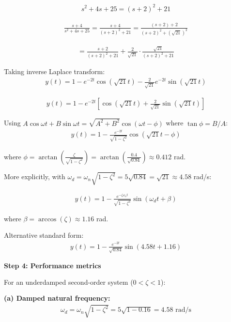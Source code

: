 \documentclass[11pt,a4paper]{article}
\begin{document}
\begin{align}
s^2 + 4s + 25 = (s+2)^2 + 21
\end{align}

\begin{align}
\frac{s + 4}{s^2 + 4s + 25} = \frac{s + 4}{(s+2)^2 + 21} = \frac{(s+2) + 2}{(s+2)^2 + (\sqrt{21})^2}
\end{align}

\begin{align}
= \frac{s+2}{(s+2)^2 + 21} + \frac{2}{\sqrt{21}} \cdot \frac{\sqrt{21}}{(s+2)^2 + 21}
\end{align}

Taking inverse Laplace transform:
\begin{align}
y(t) = 1 - e^{-2t}\cos(\sqrt{21}t) - \frac{2}{\sqrt{21}}e^{-2t}\sin(\sqrt{21}t)
\end{align}

\begin{align}
y(t) = 1 - e^{-2t}\left[\cos(\sqrt{21}t) + \frac{2}{\sqrt{21}}\sin(\sqrt{21}t)\right]
\end{align}

Using $A\cos\omega t + B\sin\omega t = \sqrt{A^2+B^2}\cos(\omega t - \phi)$ where $\tan\phi = B/A$:
\begin{align}
y(t) = 1 - \frac{e^{-2t}}{\sqrt{1 - \zeta^2}}\cos(\sqrt{21}t - \phi)
\end{align}

where $\phi = \arctan\left(\frac{\zeta}{\sqrt{1-\zeta^2}}\right) = \arctan\left(\frac{0.4}{\sqrt{0.84}}\right) \approx 0.412$ rad.

More explicitly, with $\omega_d = \omega_n\sqrt{1-\zeta^2} = 5\sqrt{0.84} = \sqrt{21} \approx 4.58$ rad/s:

\begin{align}
y(t) = 1 - \frac{e^{-\zeta\omega_n t}}{\sqrt{1-\zeta^2}}\sin(\omega_d t + \beta)
\end{align}

where $\beta = \arccos(\zeta) \approx 1.16$ rad.

Alternative standard form:
\begin{align}
y(t) = 1 - \frac{e^{-2t}}{\sqrt{0.84}}\sin(4.58t + 1.16)
\end{align}

\textbf{Step 4: Performance metrics}

For an underdamped second-order system ($0 < \zeta < 1$):

\textbf{(a) Damped natural frequency:}
\begin{align}
\omega_d = \omega_n\sqrt{1-\zeta^2} = 5\sqrt{1-0.16} = 4.58 \text{ rad/s}
\end{align}
\end{document}
